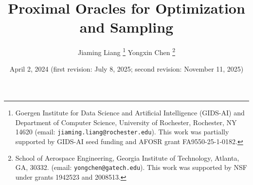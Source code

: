 \documentclass[11pt,letterpaper]{article}
\begin{document}
	\title{Proximal Oracles for Optimization and Sampling}
	\date{April 2, 2024 (first revision: July 8, 2025; second revision: November 11, 2025)}
	\author{
		Jiaming Liang \thanks{Goergen Institute for Data Science and Artificial Intelligence (GIDS-AI) and Department of Computer Science, University of Rochester, Rochester, NY 14620 (email: {\tt jiaming.liang@rochester.edu}). This work was partially supported by GIDS-AI seed funding and AFOSR grant FA9550-25-1-0182.}
		\qquad
		Yongxin Chen \thanks{School of Aerospace Engineering, Georgia Institute of
			Technology, Atlanta, GA, 30332. (email: {\tt yongchen@gatech.edu}). This work was supported by NSF under grants 1942523 and 2008513.}
	}
	\maketitle
	
\end{document}
